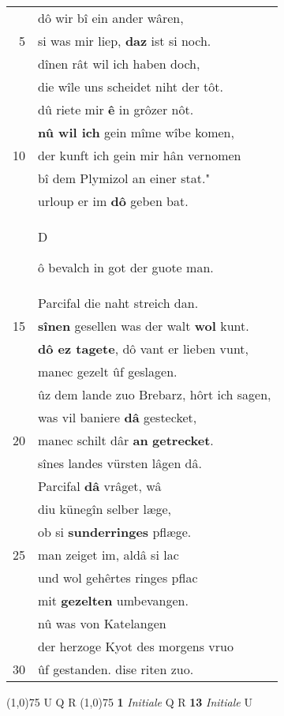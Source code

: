 \documentclass[8pt,a4paper,notitlepage]{article}
\begin{document}
\begin{table}[ht]
\begin{minipage}[t]{0.5\linewidth}
\begin{tabular}{rl}
 & dô wir bî ein ander wâren,\\ 
5 & si was mir liep, \textbf{daz} ist si noch.\\ 
 & dînen rât wil ich haben doch,\\ 
 & die wîle uns scheidet niht der tôt.\\ 
 & dû riete mir \textbf{ê} in grôzer nôt.\\ 
 & \textbf{nû wil ich} gein mîme wîbe komen,\\ 
10 & der kunft ich gein mir hân vernomen\\ 
 & bî dem Plymizol an einer stat."\\ 
 & urloup er im \textbf{dô} geben bat.\\ 
 & \begin{large}D\end{large}ô bevalch in got der guote man.\\ 
 & Parcifal die naht streich dan.\\ 
15 & \textbf{sînen} gesellen was der walt \textbf{wol} kunt.\\ 
 & \textbf{dô ez tagete}, dô vant er lieben vunt,\\ 
 & manec gezelt ûf geslagen.\\ 
 & ûz dem lande zuo Brebarz, hôrt ich sagen,\\ 
 & was vil baniere \textbf{dâ} gestecket,\\ 
20 & manec schilt dâr \textbf{an} \textbf{getrecket}.\\ 
 & sînes landes vürsten lâgen dâ.\\ 
 & Parcifal \textbf{dâ} vrâget, wâ\\ 
 & diu künegîn selber læge,\\ 
 & ob si \textbf{sunderringes} pflæge.\\ 
25 & man zeiget im, aldâ si lac\\ 
 & und wol gehêrtes ringes pflac\\ 
 & mit \textbf{gezelten} umbevangen.\\ 
 & nû was von Katelangen\\ 
 & der herzoge Kyot des morgens vruo\\ 
30 & ûf gestanden. dise riten zuo.\\ 
\end{tabular}
\scriptsize
\line(1,0){75} \newline
U Q R \newline
\line(1,0){75} \newline
\textbf{1} \textit{Initiale} Q R  \textbf{13} \textit{Initiale} U  \newline

\end{minipage}
\end{table}
\end{document}
